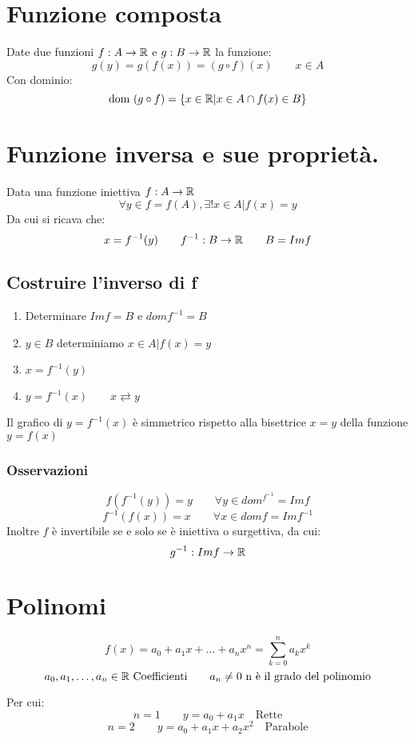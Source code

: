 \section{Funzione composta}
Date due funzioni $f:A\rightarrow \mathbb{R}$ e $g:B\rightarrow \mathbb{R}$ la funzione:
\[g(y)=g(f(x))=(g\circ f)(x) \qquad x \in A\]
Con dominio:
\[\text{dom } (g\circ f)=\{x\in \mathbb{R} | x\in A \cap f(x) \in B \}\]

\section{Funzione inversa e sue proprietà.}
Data una funzione iniettiva $f:A\rightarrow \mathbb{R}$
\[\forall y \in f=f(A), \exists ! x\in A | f(x)=y\]
Da cui si ricava che:
\[x=f^{-1}(y) \qquad f^{-1}: B\rightarrow \mathbb{R} \qquad B=Im f\]
\subsection{Costruire l'inverso di f}
\begin{enumerate}
	\item Determinare $Im f=B$ e $dom f^{-1}=B$
	\item $y \in B$ determiniamo $x \in A | f(x)=y$
	\item $x=f^{-1}(y)$
	\item $y=f^{-1}(x) \qquad x\rightleftarrows y$
\end{enumerate}
Il grafico di $y=f^{-1}(x)$ è simmetrico rispetto alla bisettrice $x=y$ della funzione $y=f(x)$
\subsubsection{Osservazioni}
\[f(f^{-1}(y)) = y \qquad \forall y \in dom^{f^{-1}}=Im f \]
\[f^{-1}(f(x)) = x \qquad \forall x \in dom f = Im f^{-1}\]
Inoltre $f$ è invertibile se e solo se è iniettiva o surgettiva, da cui: 
\[g^{-1}:Im f \rightarrow \mathbb{R}\]


\section{Polinomi}
\[f(x)=a_0+a_1 x + \dots + a_n x^n =\displaystyle\sum_{k=0}^{n} a_k x^k \]
\[a_0, a_1, \dots, a_n \in \mathbb{R} \text{ Coefficienti}\qquad a_n \neq 0 \text{ n è il grado del polinomio}\]

Per cui:
\[n=1 \qquad y=a_0+a_1 x \quad \text{Rette}\]
\[n=2 \qquad y=a_0+a_1 x + a_2 x^2 \quad \text{Parabole}\]
